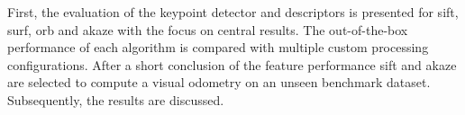 First, the evaluation of the keypoint detector and descriptors is presented for \acrshort{sift}, \acrshort{surf}, \acrshort{orb} and \acrshort{akaze} with the focus on central results.
The out-of-the-box performance of each algorithm is compared with multiple custom processing configurations.
After a short conclusion of the feature performance \acrshort{sift} and \acrshort{akaze} are selected to compute a visual odometry on an unseen benchmark dataset.
Subsequently, the results are discussed.
